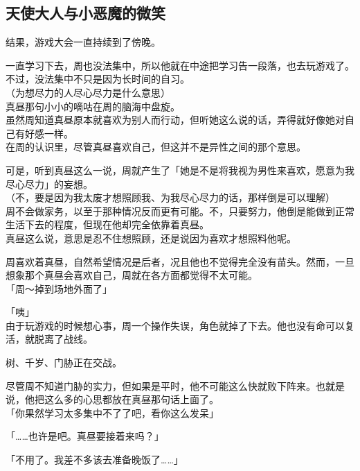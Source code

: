 \subsection{天使大人与小恶魔的微笑}

结果，游戏大会一直持续到了傍晚。

一直学习下去，周也没法集中，所以他就在中途把学习告一段落，也去玩游戏了。不过，没法集中不只是因为长时间的自习。\\

（为想尽力的人尽心尽力是什么意思）\\

真昼那句小小的嘀咕在周的脑海中盘旋。\\

虽然周知道真昼原本就喜欢为别人而行动，但听她这么说的话，弄得就好像她对自己有好感一样。\\

在周的认识里，尽管真昼喜欢自己，但这并不是异性之间的那个意思。

可是，听到真昼这么一说，周就产生了「她是不是将我视为男性来喜欢，愿意为我尽心尽力」的妄想。\\

（不，要是因为我太废才想照顾我、为我尽心尽力的话，那样倒是可以理解）\\

周不会做家务，以至于那种情况反而更有可能。不，只要努力，他倒是能做到正常生活下去的程度，但现在他却完全依靠着真昼。\\

真昼这么说，意思是忍不住想照顾，还是说因为喜欢才想照料他呢。

周喜欢着真昼，自然希望情况是后者，况且他也不觉得完全没有苗头。然而，一旦想象那个真昼会喜欢自己，周就在各方面都觉得不太可能。\\

「周～掉到场地外面了」

「咦」\\

由于玩游戏的时候想心事，周一个操作失误，角色就掉了下去。他也没有命可以复活，就脱离了战线。

树、千岁、门胁正在交战。

尽管周不知道门胁的实力，但如果是平时，他不可能这么快就败下阵来。也就是说，他把这么多的心思都放在真昼那句话上面了。\\

「你果然学习太多集中不了了吧，看你这么发呆」

「……也许是吧。真昼要接着来吗？」

「不用了。我差不多该去准备晚饭了……」\\

